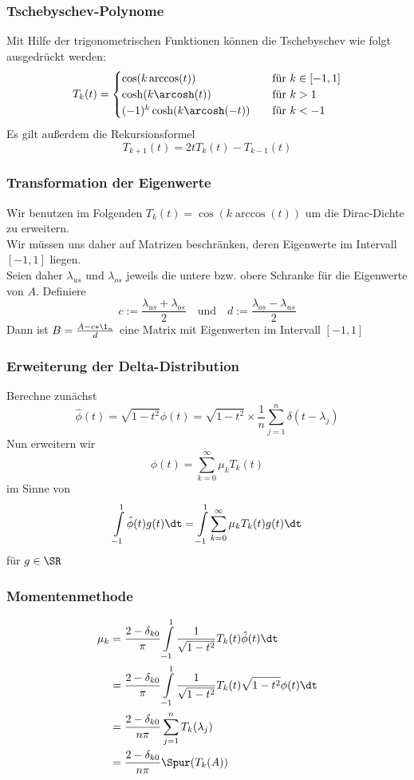 \begin{frame}
    \frametitle{Tschebyschev-Polynome}
    Mit Hilfe der trigonometrischen Funktionen können die Tschebyschev wie folgt ausgedrückt werden:
    \[ T_k(t) =
    \begin{cases}
        \cos(k \arccos(t))            & \quad \text{für } k \in [-1, 1]\\
        \cosh(k \arcosh(t))           & \quad \text{für } k > 1\\
        (-1)^k \cosh(k \arcosh(-t))   & \quad \text{für } k < -1
    \end{cases}
    \]
    \pause
    Es gilt außerdem die Rekursionsformel
    $$T_{k + 1}(t) = 2tT_k(t) - T_{k - 1}(t)$$
\end{frame}

\begin{frame}
    \frametitle{Transformation der Eigenwerte}
    \pause
    Wir benutzen im Folgenden $T_k(t) = \cos(k \arccos(t))$ um die Dirac-Dichte zu erweitern.\\
    \pause
    Wir müssen uns daher auf Matrizen beschränken, deren Eigenwerte im Intervall $[-1, 1]$ liegen.\\
    \pause
    Seien daher $\lambda_{us}$ und $\lambda_{os}$ jeweils die untere bzw. obere Schranke für die Eigenwerte von $A$.
    Definiere
    $$c := \frac{\lambda_{us} + \lambda_{os}}{2} \quad \text{und} \quad d := \frac{\lambda_{os} - \lambda_{us}}{2}$$
    Dann ist $B = \frac{A - c*\1_n}{d}$ eine Matrix mit Eigenwerten im Intervall $[-1, 1]$
\end{frame}

\begin{frame}
    \frametitle{Erweiterung der Delta-Distribution}
    Berechne zunächst
    $$\hat{\phi}(t) = \sqrt{1 - t^2} \phi(t) = \sqrt{1 - t^2} \times \frac{1}{n} \sum_{j = 1}^n \delta(t - \lambda_j)$$
    Nun erweitern wir
    $$\hat{\phi}(t) = \sum_{k = 0}^{\infty} \mu_k T_k(t)$$
    im Sinne von
    $$\int \limits_{-1}^1 \hat{\phi}(t) g(t) \dt = \int \limits_{-1}^1 \sum_{k = 0}^{\infty} \mu_k T_k(t) g(t) \dt$$
    für $g \in \SR$
\end{frame}

\begin{frame}
    \frametitle{Momentenmethode}
    \begin{align*}
        \mu_k &= \frac{2 - \delta_{k0}}{\pi} \int\limits_{-1}^1 \frac{1}{\sqrt{1 - t^2}} T_k(t) \hat\phi(t) \dt\\
        &= \frac{2 - \delta_{k0}}{\pi} \int\limits_{-1}^1 \frac{1}{\sqrt{1 - t^2}} T_k(t) \sqrt{1 - t^2} \phi(t) \dt\\
        &= \frac{2 - \delta_{k0}}{n \pi} \sum_{j = 1}^n T_k(\lambda_j)\\
        &= \frac{2 - \delta_{k0}}{n \pi} \Spur(T_k(A))
    \end{align*}
\end{frame}

